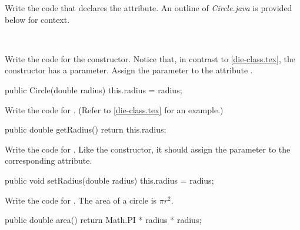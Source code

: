 \Q Write the code that declares the  attribute.
An outline of \textit{Circle.java} is provided below for context.

\begin{javalst}
public class Circle {
\end{javalst}

{\tt ~~~}

\medskip

\begin{javalst}
    // constructor goes here
    
    // other methods go here
}
\end{javalst}


\Q Write the code for the  constructor.
Notice that, in contrast to \ref{die-class.tex}, the  constructor has a parameter.
Assign the parameter  to the attribute .

\begin{answer}[5em]
\begin{javaans}
public Circle(double radius) {
    this.radius = radius;
}
\end{javaans}
\end{answer}


\Q Write the code for .
(Refer to \ref{die-class.tex} for an example.)

\begin{answer}[5em]
\begin{javaans}
public double getRadius() {
    return this.radius;
}
\end{javaans}
\end{answer}


\Q Write the code for .
Like the constructor, it should assign the parameter to the corresponding attribute.

\begin{answer}[5em]
\begin{javaans}
public void setRadius(double radius) {
    this.radius = radius;
}
\end{javaans}
\end{answer}


\Q Write the code for .
The area of a circle is $\pi r^2$.

\begin{answer}[5em]
\begin{javaans}
public double area() {
    return Math.PI * radius * radius;
}
\end{javaans}
\end{answer}


